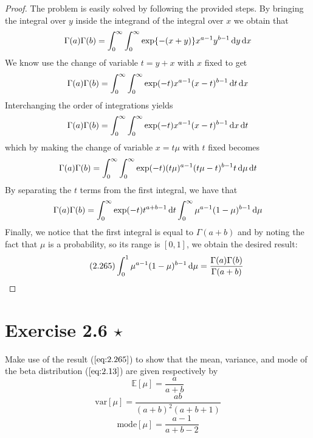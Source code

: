 \begin{proof}
    The problem is easily solved by following the provided steps.
    By bringing the integral over $y$ inside the integrand of 
    the integral over $x$ we obtain that
    \[
        \Gamma(a)\Gamma(b) = \int_{0}^{\infty} \int_{0}^{\infty}
        \exp\{-(x + y)\} x^{a - 1} y^{b - 1} \mathop{}\!\mathrm{d} y \mathop{}\!\mathrm{d} x
    \] 
    We know use the change of variable $t = y+x$ with $x$ fixed
    to get
    \[
        \Gamma(a)\Gamma(b) = \int_{0}^{\infty} \int_{0}^{\infty}
        \exp(-t) x^{a - 1} (x - t)^{b - 1} \mathop{}\!\mathrm{d} t \mathop{}\!\mathrm{d} x
    \] 
    Interchanging the order of integrations yields
    \[
        \Gamma(a)\Gamma(b) = \int_{0}^{\infty} \int_{0}^{\infty}
        \exp(-t) x^{a - 1} (x - t)^{b - 1} \mathop{}\!\mathrm{d} x \mathop{}\!\mathrm{d} t
    \] 
    which by making the change of variable $x = t\mu$ with $t$ fixed
    becomes
    \[
        \Gamma(a)\Gamma(b) = \int_{0}^{\infty} \int_{0}^{\infty}
        \exp(-t) (t\mu)^{a - 1} (t\mu - t)^{b - 1} t \mathop{}\!\mathrm{d} \mu \mathop{}\!\mathrm{d} t
    \] 
    By separating the $t$ terms from the first integral, we have that
     \[
         \Gamma(a)\Gamma(b) = \int_{0}^{\infty} 
         \exp(-t) t^{a + b - 1} \mathop{}\!\mathrm{d} t
         \int_{0}^{\infty} \mu^{a - 1}(1 - \mu)^{b - 1} \mathop{}\!\mathrm{d} \mu
    \] 
    Finally, we notice that the first integral is equal to $\Gamma(a+b)$ 
    and by noting the fact that $\mu$ is a probability, so its
    range is $[0, 1]$, we obtain the desired result:
    \begin{equation}\tag{2.265}
        \int_{0}^{1} \mu^{a-1}(1 - \mu)^{b - 1} \mathop{}\!\mathrm{d} \mu = \frac{\Gamma(a)\Gamma(b)}{\Gamma(a+b)}
    \end{equation}
\end{proof}

\section*{Exercise 2.6 $\star$} 
Make use of the result ($\ref{eq:2.265}$) to show that the mean,
variance, and mode of the beta distribution ($\ref{eq:2.13}$) are given 
respectively by 
\begin{equation}\label{eq:2.267}\tag{2.267}
    \mathbb{E}[\mu] = \frac{a}{a + b}
\end{equation}
\begin{equation}\label{eq:2.268}\tag{2.268}
    \text{var}[\mu] = \frac{ab}{(a + b)^2(a + b + 1)}
\end{equation}
\begin{equation}\label{eq:2.269}\tag{2.269}
    \text{mode}[\mu] = \frac{a - 1}{a + b - 2}
\end{equation}

